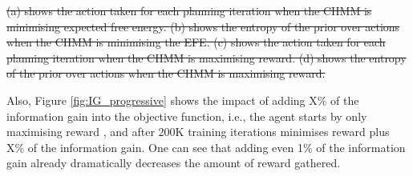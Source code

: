 \documentclass[twoside,11pt]{article}
\providecommand{\DIFadd}[1]{{\protect\color{blue}\uwave{#1}}} %
\providecommand{\DIFdel}[1]{{\protect\color{red}\sout{#1}}}                      %
\providecommand{\DIFaddbegin}{} %
\providecommand{\DIFaddend}{} %
\providecommand{\DIFdelbegin}{} %
\providecommand{\DIFdelend}{} %
\providecommand{\DIFdelFL}[1]{\DIFdel{#1}} %
\begin{document}
{%
\DIFdelFL{(a) shows the action taken for each planning iteration when the CHMM is minimising expected free energy.
             (b) shows the entropy of the prior over actions when the CHMM is minimising the EFE.
             (c) shows the action taken for each planning iteration when the CHMM is maximising reward.
             (d) shows the entropy of the prior over actions when the CHMM is maximising reward.
    }}

\DIFdelend Also, Figure \ref{fig:IG_progressive} shows the impact of adding X\% of the information gain into the objective function, i.e., the agent starts by only maximising reward \DIFaddbegin \DIFadd{(c.f. Equation \ref{eq:reward_maximisation})}\DIFaddend , and after 200K training iterations minimises reward plus X\% of the information gain. One can see that adding even 1\% of the information gain already dramatically decreases the amount of reward gathered.

\DIFdelbegin %




\end{document}
